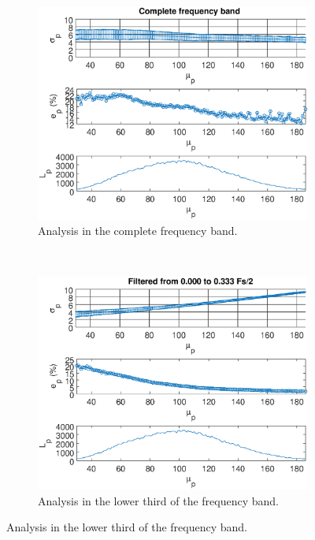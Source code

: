\documentclass[review]{elsarticle}
\begin{document}
\begin{figure}[h!]
    \centering
    \begin{subfigure}[b]{0.475\textwidth}
        \includegraphics[width=\textwidth]{stdall_curve.eps}
	\caption{Analysis in the complete frequency band.}
        \label{fig:illlevel_all}
    \end{subfigure}
    ~
    \begin{subfigure}[b]{0.475\textwidth}
        \includegraphics[width=\textwidth]{stdx_curve.eps}
	\caption{Analysis in the lower third of the frequency band.}
        \label{fig:illlevel_stdx}
    \end{subfigure}

\end{figure}
\end{document}
